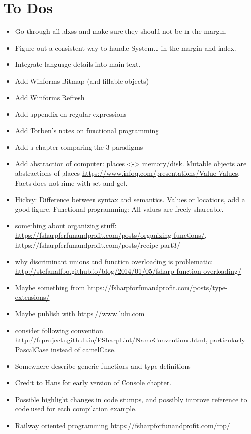 \documentclass[springer.tex]{subfiles}
\begin{document}
\chapter{To Dos}
\begin{itemize}
\item Go through all idxss and make sure they should not be in the
  margin.
\item Figure out a consistent way to handle System... in the margin
  and index.
\item Integrate language details into main text.
\item Add Winforms Bitmap (and fillable objects)
\item Add Winforms Refresh
\item Add appendix on regular expressions
\item Add Torben's notes on functional programming
\item Add a chapter comparing the 3 paradigms
\item Add abstraction of computer: places <-> memory/disk. Mutable objects are abstractions of places \url{https://www.infoq.com/presentations/Value-Values}. Facts does not rime with set and get. 
\item Hickey: Difference between syntax and semantics. Values or locations, add a good figure. Functional programming: All values are freely shareable.
\item something about organizing stuff: \url{https://fsharpforfunandprofit.com/posts/organizing-functions/}, \url{https://fsharpforfunandprofit.com/posts/recipe-part3/}
\item why discriminant unions and function overloading is problematic: \url{http://stefanalfbo.github.io/blog/2014/01/05/fsharp-function-overloading/}
\item Maybe something from \url{https://fsharpforfunandprofit.com/posts/type-extensions/}
\item Maybe publish with \url{https://www.lulu.com}
\item consider following convention \url{http://fsprojects.github.io/FSharpLint/NameConventions.html},  particularly PascalCase instead of camelCase.
\item Somewhere describe generic functions and type definitions
\item Credit to Hans for early version of Console chapter.
\item Possible highlight changes in code stumps, and possibly improve reference to code used for each compilation example.
\item Railway oriented programming \url{https://fsharpforfunandprofit.com/rop/}

\end{itemize}
\end{document}
